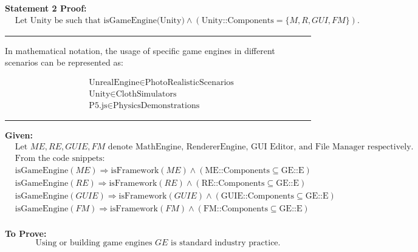 \textbf{Statement 2 Proof:}
\begin{equation}
\begin{aligned}
&\text{Let Unity be such that } \text{isGameEngine(Unity)} \land (\text{Unity::Components} = \{M, R, GUI, FM\}).
\end{aligned}
\end{equation}








\noindent\rule{\linewidth}{0.4pt}


In mathematical notation, the usage of specific game engines in different scenarios can be represented as:

\[
\begin{aligned}
&\text{UnrealEngine} \in \text{PhotoRealisticScenarios} \\
&\text{Unity} \in \text{ClothSimulators} \\
&\text{P5.js} \in \text{PhysicsDemonstrations}
\end{aligned}
\]

\noindent\rule{\linewidth}{0.4pt}

\textbf{Given:}
\begin{align*}
&\text{Let } ME, RE, GUIE, FM \text{ denote MathEngine, RendererEngine, GUI Editor, and File Manager respectively.} \\
&\text{From the code snippets:} \\
&\text{isGameEngine}(ME) \Rightarrow \text{isFramework}(ME) \land (\text{ME::Components} \subseteq \text{GE::E}) \\
&\text{isGameEngine}(RE) \Rightarrow \text{isFramework}(RE) \land (\text{RE::Components} \subseteq \text{GE::E}) \\
&\text{isGameEngine}(GUIE) \Rightarrow \text{isFramework}(GUIE) \land (\text{GUIE::Components} \subseteq \text{GE::E}) \\
&\text{isGameEngine}(FM) \Rightarrow \text{isFramework}(FM) \land (\text{FM::Components} \subseteq \text{GE::E}) \\
\end{align*}

\textbf{To Prove:}
\[
\text{Using or building game engines } GE \text{ is standard industry practice.}
\]

